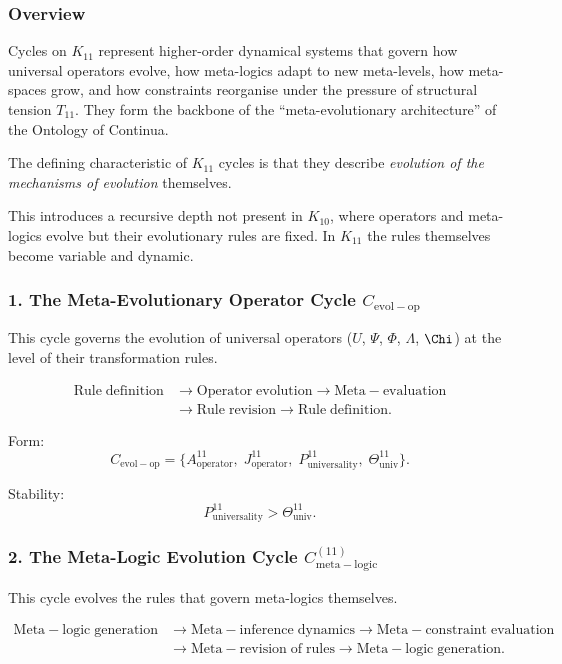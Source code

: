 \subsubsection{Overview}

Cycles on $K_{11}$ represent higher-order dynamical systems that govern
how universal operators evolve, how meta-logics adapt to new meta-levels,
how meta-spaces grow, and how constraints reorganise under the pressure of
structural tension $T_{11}$. They form the backbone of the ``meta-evolutionary
architecture'' of the Ontology of Continua.

The defining characteristic of $K_{11}$ cycles is that they describe
\emph{evolution of the mechanisms of evolution} themselves.

This introduces a recursive depth not present in $K_{10}$, where operators
and meta-logics evolve but their evolutionary rules are fixed.  
In $K_{11}$ the rules themselves become variable and dynamic.


\subsubsection{1. The Meta-Evolutionary Operator Cycle $C_{\mathrm{evol-op}}$}

This cycle governs the evolution of universal operators ($U$, $\Psi$, $\Phi$,
$\Lambda$, $\Chi$) at the level of their transformation rules.

\[
  \begin{aligned}
  \mathrm{Rule\;definition}
  &\to \mathrm{Operator\;evolution}
  \to \mathrm{Meta\!-\!evaluation}\\
  &\to \mathrm{Rule\;revision}
  \to \mathrm{Rule\;definition}.
  \end{aligned}
\]

Form:
\[
  C_{\mathrm{evol-op}}
  =
  \{
    A^{11}_{\mathrm{operator}},\;
    J^{11}_{\mathrm{operator}},\;
    P^{11}_{\mathrm{universality}},\;
    \Theta^{11}_{\mathrm{univ}}
  \}.
\]

Stability:
\[
  P^{11}_{\mathrm{universality}}>\Theta^{11}_{\mathrm{univ}}.
\]


\subsubsection{2. The Meta-Logic Evolution Cycle $C_{\mathrm{meta\!-\!logic}}^{(11)}$}

This cycle evolves the rules that govern meta-logics themselves.

\[
  \begin{aligned}
  \mathrm{Meta\!-\!logic\;generation}
  &\to \mathrm{Meta\!-\!inference\;dynamics}
  \to \mathrm{Meta\!-\!constraint\;evaluation}\\
  &\to \mathrm{Meta\!-\!revision\;of\;rules}
  \to \mathrm{Meta\!-\!logic\;generation}.
  \end{aligned}
\]

